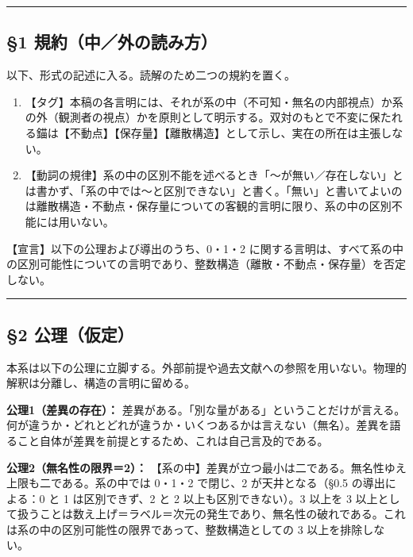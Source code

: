 \documentclass[11pt]{ltjsarticle}
\providecommand{\tightlist}{\setlength{\itemsep}{0pt}\setlength{\parskip}{0pt}}
\begin{document}
\begin{center}\rule{0.5\linewidth}{0.5pt}\end{center}

\subsection{§1
規約（中／外の読み方）}\label{ux898fux7d04ux4e2dux5916ux306eux8aadux307fux65b9}

以下、形式の記述に入る。読解のため二つの規約を置く。

\begin{enumerate}
\def\labelenumi{\arabic{enumi}.}
\tightlist
\item
  【タグ】本稿の各言明には、それが系の中（不可知・無名の内部視点）か系の外（観測者の視点）かを原則として明示する。双対のもとで不変に保たれる錨は【不動点】【保存量】【離散構造】として示し、実在の所在は主張しない。
\item
  【動詞の規律】系の中の区別不能を述べるとき「〜が無い／存在しない」とは書かず、「系の中では〜と区別できない」と書く。「無い」と書いてよいのは離散構造・不動点・保存量についての客観的言明に限り、系の中の区別不能には用いない。
\end{enumerate}

【宣言】以下の公理および導出のうち、0・1・2
に関する言明は、すべて系の中の区別可能性についての言明であり、整数構造（離散・不動点・保存量）を否定しない。

\begin{center}\rule{0.5\linewidth}{0.5pt}\end{center}

\subsection{§2 公理（仮定）}\label{ux516cux7406ux4eeeux5b9a}

本系は以下の公理に立脚する。外部前提や過去文献への参照を用いない。物理的解釈は分離し、構造の言明に留める。

\textbf{公理1（差異の存在）：}
差異がある。「別な量がある」ということだけが言える。何が違うか・どれとどれが違うか・いくつあるかは言えない（無名）。差異を語ること自体が差異を前提とするため、これは自己言及的である。

\textbf{公理2（無名性の限界＝2）：}
【系の中】差異が立つ最小は二である。無名性ゆえ上限も二である。系の中では
0・1・2 で閉じ、2 が天井となる（§0.5 の導出による：0 と 1
は区別できず、2 と 2 以上も区別できない）。3 以上を 3
以上として扱うことは数え上げ＝ラベル＝次元の発生であり、無名性の破れである。これは系の中の区別可能性の限界であって、整数構造としての
3 以上を排除しない。
\end{document}
